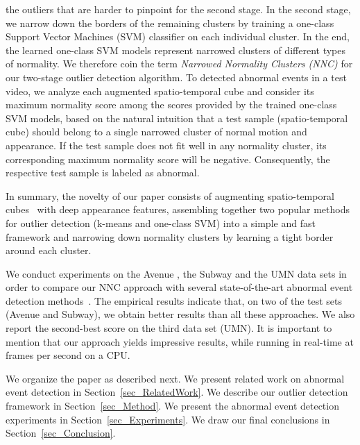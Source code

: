 \documentclass[10pt,twocolumn,letterpaper]{article}
\begin{document}
the outliers that are harder to pinpoint for the second stage. In the second stage, we narrow down the borders of the remaining clusters by training a one-class Support Vector Machines (SVM) classifier on each individual cluster. In the end, the learned one-class SVM models represent narrowed clusters of different types of normality. We therefore coin the term \emph{Narrowed Normality Clusters (NNC)} for our two-stage outlier detection algorithm. To detected abnormal events in a test video, we analyze each augmented spatio-temporal cube and consider its maximum normality score among the scores provided by the trained one-class SVM models, based on the natural intuition that a test sample (spatio-temporal cube) should belong to a single narrowed cluster of normal motion and appearance. If the test sample does not fit well in any normality cluster, its corresponding maximum normality score will be negative. Consequently, the respective test sample is labeled as abnormal. 

In summary, the novelty of our paper consists of  augmenting spatio-temporal cubes~\cite{Lu-ICCV-2013} with deep appearance features,  assembling together two popular methods for outlier detection (k-means and one-class SVM) into a simple and fast framework and  narrowing down normality clusters by learning a tight border around each cluster.


We conduct experiments on the Avenue \cite{Lu-ICCV-2013}, the Subway \cite{Adam-PAMI-2008} and the UMN \cite{Mehran-CVPR-2009} data sets in order to compare our NNC approach with several state-of-the-art abnormal event detection methods~\cite{Cheng-CVPR-2015,Cong-CVPR-2011,Giorno-ECCV-2016,Hasan-CVPR-2016,Hinami-ICCV-2017,Ionescu-ICCV-2017,Liu-CVPR-2018,Lu-ICCV-2013,Luo-ICCV-2017,Mehran-CVPR-2009,Ravanbakhsh-ICIP-2017,Saligrama-CVPR-2012,Smeureanu-ICIAP-2017,Sun-PR-2017,Zhang-PR-2016}. The empirical results indicate that, on two of the test sets (Avenue and Subway), we obtain better results than all these approaches. We also report the second-best score on the third data set (UMN). It is important to mention that our approach yields impressive results, while running in real-time at  frames per second on a CPU. 

We organize the paper as described next. We present related work on abnormal event detection in Section~\ref{sec_RelatedWork}. We describe our outlier detection framework in Section~\ref{sec_Method}. We present the abnormal event detection experiments in Section~\ref{sec_Experiments}. We draw our final conclusions in Section~\ref{sec_Conclusion}.
\end{document}

